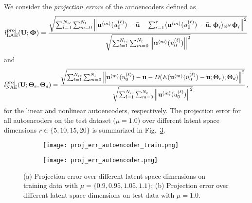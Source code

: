 We consider the \textit{projection errors} of the autoencoders defined as 
\begin{align}
    l^{\text{proj}}_{\text{LAE}}(\btU; \btPhi) = \frac{\sqrt{\sum_{l=1}^{N_{ic}}\sum_{m=0}^{N_t}\norm{\btu^{\left<m\right>}(u_0^{(\ell)}) - \bar{\btu} - \sum_{i=1}^{r} \inner{\mathbb{R}^N}{\btu^{\left<m\right>}(u_0^{(\ell)}) - \bar{\btu}}{\btphi_i}\btphi_i}^2}}{\sqrt{\sum_{l=1}^{N_{ic}}\sum_{m=0}^{N_t}\norm{\btu^{\left<m\right>}(u_0^{(\ell)})}^2}}
\end{align}
and
\begin{align}
    l^{\text{proj}}_{\text{NAE}}(\btU; \boldsymbol{\Theta}_e, \boldsymbol{\Theta}_d) = \frac{\sqrt{\sum_{l=1}^{N_{ic}}\sum_{m=0}^{N_t}\norm{\btu^{\left<m\right>}(u_0^{(\ell)}) - \bar{\btu} - D(E(\btu^{\left<m\right>}(u_0^{(\ell)}) - \bar{\btu}; \boldsymbol{\Theta}_e); \boldsymbol{\Theta}_d)}^2}}{\sqrt{\sum_{l=1}^{N_{ic}}\sum_{m=0}^{N_t}\norm{\btu^{\left<m\right>}(u_0^{(\ell)})}^2}}\,,
\end{align}
for the linear and nonlinear autoencoders, respectively. The projection error for all autoencoders on the test dataset ($\mu = 1.0$) over different latent space dimensions $r \in \{5, 10, 15, 20\}$ is summarized in Fig.~\ref{fig: proj err burger}.
\begin{figure}[!htb]
    \begin{center}
        \begin{subfigure}[b]{0.49\textwidth}
           \begin{center}
            \texttt{[image: proj\_err\_autoencoder\_train.png]}
           \end{center}
            \caption{}
            \label{fig: proj err burger train}
        \end{subfigure}
        \begin{subfigure}[b]{0.49\textwidth}
            \begin{center}
           \texttt{[image: proj\_err\_autoencoder.png]}
            \end{center}
            \caption{}
            \label{fig: proj err burger}
        \end{subfigure}
    \end{center}
        \caption[Projection error and training and test data.]{(a) Projection error over different latent space dimensions on training data with $\mu = \{0.9, 0.95, 1.05, 1.1\}$; (b) Projection error over different latent space dimensions on test data with $\mu = 1.0$.}
\end{figure}


